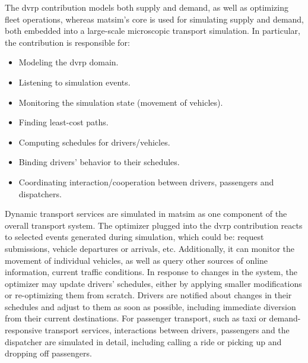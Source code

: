 The \gls{dvrp} contribution models both supply and demand, as well as optimizing fleet operations, whereas \gls{matsim}'s core is used for simulating supply and demand, both embedded into a large-scale microscopic transport simulation. In particular, the contribution is responsible for:
%
\begin{itemize}\styleItemize
	\item Modeling the \gls{dvrp} domain.
	\item Listening to simulation events.
	\item Monitoring the simulation state (\eg movement of vehicles).
	\item Finding least-cost paths.
	\item Computing schedules for drivers/vehicles.
	\item Binding drivers' behavior to their schedules.
	\item Coordinating interaction/cooperation between drivers, passengers and dispatchers.
\end{itemize}

Dynamic transport services are simulated in \gls{matsim} as one component of the overall transport system. The optimizer plugged into the \gls{dvrp} contribution reacts to selected events generated during simulation, which could be: request submissions, vehicle departures or arrivals, etc. Additionally, it can monitor the movement of individual vehicles, as well as query other sources of online information, \eg current traffic conditions. In response to changes in the system, the optimizer may update drivers' schedules, either by applying smaller modifications or re-optimizing them from scratch. Drivers are notified about changes in their schedules and adjust to them as soon as possible, including immediate diversion from their current destinations. For passenger transport, such as taxi or demand-responsive transport services, interactions between drivers, passengers and the dispatcher are simulated in detail, including calling a ride or picking up and dropping off passengers.

